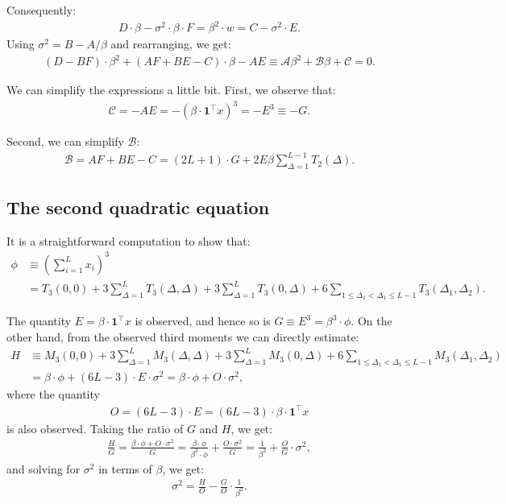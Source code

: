 \documentclass{article}
\theoremstyle{thm}
\theoremstyle{definition}
\renewcommand{\AA}{\mathcal{A}}
\newcommand{\BB}{\mathcal{B}}
\newcommand{\CC}{\mathcal{C}}
\newcommand{\1}{\mathbf{1}}
\begin{document}
Consequently:
%
\begin{align}
%
    D\cdot \beta - \sigma^2 \cdot \beta  \cdot F
    = \beta^2 \cdot w = C - \sigma^2 \cdot E.
%
\end{align}
%
Using $\sigma^2 = B - A/\beta$ and rearranging, we get:
%
\begin{align}
%
    (D - BF) \cdot \beta^2  + (AF + BE - C) \cdot \beta   - AE 
    \equiv \AA \beta^2  + \BB \beta  + \CC = 0.
%
\end{align}

We can simplify the expressions a little bit. First, we observe that:
%
\begin{align}
%
    \CC = -AE = -(\beta \cdot \1^\top x)^3 = -E^3 \equiv -G.
%
\end{align}

Second, we can simplify $\BB$:
%
\begin{align}
%
    \BB = AF + BE - C = (2L+1) \cdot G + 2E \beta \sum_{\Delta=1}^{L-1} T_2(\Delta).
%
\end{align}

%
%
%
%

\subsection{The second quadratic equation}

It is a straightforward computation to show that:
%
\begin{align}
%
    \phi &\equiv \left( \sum_{i=1}^L x_i \right)^3 
        \nonumber \\
    &= T_3(0,0) + 3\sum_{\Delta=1}^L T_3(\Delta,\Delta)
        + 3 \sum_{\Delta=1}^L T_3(0,\Delta) 
        + 6 \sum_{1 \le \Delta_1 < \Delta_1 \le L-1} T_3(\Delta_1,\Delta_2).
%
\end{align}

The quantity $E = \beta \cdot \1^\top x$ is observed, and hence so is $G \equiv E^3 = \beta^3 \cdot \phi$. On the other hand, from the observed third moments we can directly estimate:
%
\begin{align}
%
    H &\equiv M_3(0,0) + 3\sum_{\Delta=1}^L M_3(\Delta,\Delta)
        + 3 \sum_{\Delta=1}^L M_3(0,\Delta) 
        + 6 \sum_{1 \le \Delta_1 < \Delta_1 \le L-1} M_3(\Delta_1,\Delta_2)
        \nonumber \\
    &= \beta \cdot \phi +  (6L - 3) \cdot E \cdot \sigma^2 
    = \beta \cdot \phi +  O \cdot \sigma^2 ,
%
\end{align}
%
where the quantity
%
\begin{align}
%
    O = (6L - 3) \cdot E = (6L - 3) \cdot \beta \cdot \1^\top x
%
\end{align}
%
is also observed. Taking the ratio of $G$ and $H$, we get:
%
\begin{align}
%
    \frac{H}{G} = \frac{\beta \cdot \phi +  O \cdot \sigma^2 }{G}
    = \frac{\beta \cdot \phi}{\beta^3 \cdot \phi} + \frac{O \cdot \sigma^2}{G}
    = \frac{1}{\beta^2} + \frac{O}{G} \cdot \sigma^2,
%
\end{align}
%
and solving for $\sigma^2$ in terms of $\beta$, we get:
%
\begin{align}
%
    \sigma^2 = \frac{H}{O} - \frac{G}{O} \cdot \frac{1}{\beta^2}.
%
\end{align}
\end{document}
